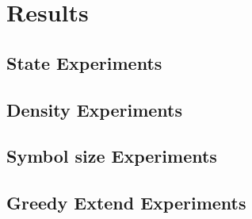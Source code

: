 \FloatBarrier
\section{Results}

\subsection{State Experiments}
	

\subsection{Density Experiments}
	

\subsection{Symbol size Experiments}
	
	
\subsection{Greedy Extend Experiments}
	